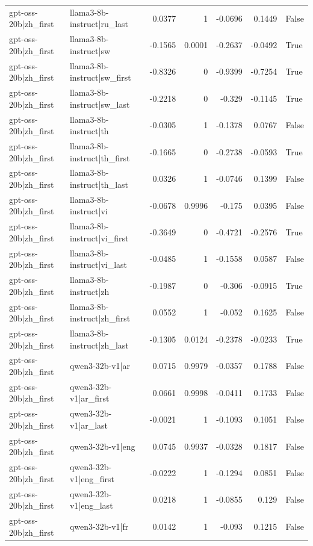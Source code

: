 \begin{table}
\begin{tabular}{l l r r r r l}
gpt-oss-20b|zh_first & llama3-8b-instruct|ru_last & 0.0377 & 1 & -0.0696 & 0.1449 & False \\
gpt-oss-20b|zh_first & llama3-8b-instruct|sw & -0.1565 & 0.0001 & -0.2637 & -0.0492 & True \\
gpt-oss-20b|zh_first & llama3-8b-instruct|sw_first & -0.8326 & 0 & -0.9399 & -0.7254 & True \\
gpt-oss-20b|zh_first & llama3-8b-instruct|sw_last & -0.2218 & 0 & -0.329 & -0.1145 & True \\
gpt-oss-20b|zh_first & llama3-8b-instruct|th & -0.0305 & 1 & -0.1378 & 0.0767 & False \\
gpt-oss-20b|zh_first & llama3-8b-instruct|th_first & -0.1665 & 0 & -0.2738 & -0.0593 & True \\
gpt-oss-20b|zh_first & llama3-8b-instruct|th_last & 0.0326 & 1 & -0.0746 & 0.1399 & False \\
gpt-oss-20b|zh_first & llama3-8b-instruct|vi & -0.0678 & 0.9996 & -0.175 & 0.0395 & False \\
gpt-oss-20b|zh_first & llama3-8b-instruct|vi_first & -0.3649 & 0 & -0.4721 & -0.2576 & True \\
gpt-oss-20b|zh_first & llama3-8b-instruct|vi_last & -0.0485 & 1 & -0.1558 & 0.0587 & False \\
gpt-oss-20b|zh_first & llama3-8b-instruct|zh & -0.1987 & 0 & -0.306 & -0.0915 & True \\
gpt-oss-20b|zh_first & llama3-8b-instruct|zh_first & 0.0552 & 1 & -0.052 & 0.1625 & False \\
gpt-oss-20b|zh_first & llama3-8b-instruct|zh_last & -0.1305 & 0.0124 & -0.2378 & -0.0233 & True \\
gpt-oss-20b|zh_first & qwen3-32b-v1|ar & 0.0715 & 0.9979 & -0.0357 & 0.1788 & False \\
gpt-oss-20b|zh_first & qwen3-32b-v1|ar_first & 0.0661 & 0.9998 & -0.0411 & 0.1733 & False \\
gpt-oss-20b|zh_first & qwen3-32b-v1|ar_last & -0.0021 & 1 & -0.1093 & 0.1051 & False \\
gpt-oss-20b|zh_first & qwen3-32b-v1|eng & 0.0745 & 0.9937 & -0.0328 & 0.1817 & False \\
gpt-oss-20b|zh_first & qwen3-32b-v1|eng_first & -0.0222 & 1 & -0.1294 & 0.0851 & False \\
gpt-oss-20b|zh_first & qwen3-32b-v1|eng_last & 0.0218 & 1 & -0.0855 & 0.129 & False \\
gpt-oss-20b|zh_first & qwen3-32b-v1|fr & 0.0142 & 1 & -0.093 & 0.1215 & False \\

\end{tabular}
\end{table}
